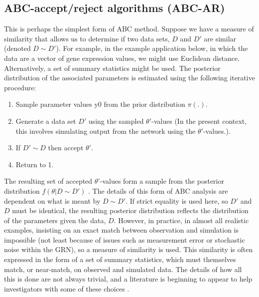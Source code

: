 \subsection{ABC-accept/reject algorithms (ABC-AR)}
This is perhaps the simplest form of ABC method. Suppose we have a measure of similarity that allows us to determine if two data sets, $D$ and $D'$ are similar (denoted $D \sim D'$). For example, in the example application below, in which the data are a vector of gene expression values, we might use Euclidean distance. Alternatively, a set of summary statistics might be used. The posterior distribution of the associated parameters is estimated using the following iterative procedure:
\begin{enumerate}
    \item Sample parameter values y0 from the prior distribution $\pi(.)$.
    \item Generate a data set $D'$ using the sampled $\theta '$-values (In the present context, this involves simulating output from the network using the $\theta '$-values.).
    \item If $D' \sim D$ then accept $\theta '$. 
    \item Return to 1.
\end{enumerate}

The resulting set of accepted $\theta '$-values form a sample from the posterior distribution $f(\theta | D\sim D')$ \cite{ripley82,rubin84, tavare97}. The details of this form of ABC analysis are dependent on what is meant by $D \sim D'$. If strict equality is used here, so $D'$ and $D$ must be identical, the resulting posterior distribution reflects the distribution of the parameters given the data, $D$. However, in practice, in almost all realistic examples, insisting on an exact match between observation and simulation is impossible (not least because of issues such as measurement error or stochastic noise within the GRN), so a measure of similarity is used. This similarity is often expressed in the form of a set of summary statistics, which must themselves match, or near-match, on observed and simulated data. The details of how all this is done are not always trivial, and a literature is beginning to appear to help investigators with some of these choices \cite{joyce08, nunes10, jung11}.

